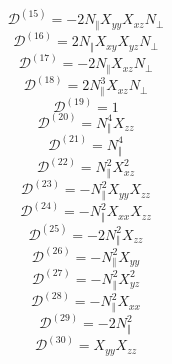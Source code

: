 \documentclass[a4paper,12pt]{article}%
\begin{document}
\begin{equation}
\mathcal{D}^{\left(  15\right)  }=-2N_{\Vert}X_{yy}X_{xz}N_{\bot}%
\end{equation}%
\begin{equation}
\mathcal{D}^{\left(  16\right)  }=2N_{\Vert}X_{xy}X_{yz}N_{\bot}%
\end{equation}%
\begin{equation}
\mathcal{D}^{\left(  17\right)  }=-2N_{\Vert}X_{xz}N_{\bot}%
\end{equation}%
\begin{equation}
\mathcal{D}^{\left(  18\right)  }=2N_{\Vert}^{3}X_{xz}N_{\bot}%
\end{equation}%
\begin{equation}
\mathcal{D}^{\left(  19\right)  }=1
\end{equation}%
\begin{equation}
\mathcal{D}^{\left(  20\right)  }=N_{\Vert}^{4}X_{zz}%
\end{equation}%
\begin{equation}
\mathcal{D}^{\left(  21\right)  }=N_{\Vert}^{4}%
\end{equation}%
\begin{equation}
\mathcal{D}^{\left(  22\right)  }=N_{\Vert}^{2}X_{xz}^{2}%
\end{equation}%
\begin{equation}
\mathcal{D}^{\left(  23\right)  }=-N_{\Vert}^{2}X_{yy}X_{zz}%
\end{equation}%
\begin{equation}
\mathcal{D}^{\left(  24\right)  }=-N_{\Vert}^{2}X_{xx}X_{zz}%
\end{equation}%
\begin{equation}
\mathcal{D}^{\left(  25\right)  }=-2N_{\Vert}^{2}X_{zz}%
\end{equation}%
\begin{equation}
\mathcal{D}^{\left(  26\right)  }=-N_{\Vert}^{2}X_{yy}%
\end{equation}%
\begin{equation}
\mathcal{D}^{\left(  27\right)  }=-N_{\Vert}^{2}X_{yz}^{2}%
\end{equation}%
\begin{equation}
\mathcal{D}^{\left(  28\right)  }=-N_{\Vert}^{2}X_{xx}%
\end{equation}%
\begin{equation}
\mathcal{D}^{\left(  29\right)  }=-2N_{\Vert}^{2}%
\end{equation}%
\begin{equation}
\mathcal{D}^{\left(  30\right)  }=X_{yy}X_{zz}%
\end{equation}%
\end{document}
